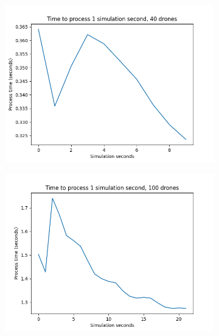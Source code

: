 \begin{figure}
    \centering
    \begin{subfigure}[b]{0.4\textwidth}
        \centering
        \includegraphics[width=\textwidth]{img/time_process_1s_simulation_40drones.png}
    \end{subfigure}
    \hfill
    \begin{subfigure}[b]{0.4\textwidth}
        \centering
        \includegraphics[width=\textwidth]{img/time_process_1s_simulation_100drones.png}
    \end{subfigure}
    \begin{subfigure}[b]{0.5\textwidth}
        \centering

\end{subfigure}
\end{figure}
